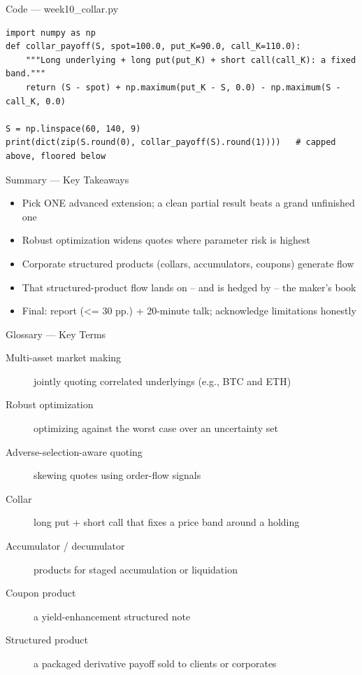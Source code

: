 \documentclass[aspectratio=169,10pt]{beamer}
\begin{document}
\begin{frame}[fragile]{Code --- week10\_collar.py}
\begin{lstlisting}
import numpy as np
def collar_payoff(S, spot=100.0, put_K=90.0, call_K=110.0):
    """Long underlying + long put(put_K) + short call(call_K): a fixed band."""
    return (S - spot) + np.maximum(put_K - S, 0.0) - np.maximum(S - call_K, 0.0)

S = np.linspace(60, 140, 9)
print(dict(zip(S.round(0), collar_payoff(S).round(1))))   # capped above, floored below
\end{lstlisting}
\end{frame}
\begin{frame}{Summary --- Key Takeaways}
\begin{itemize}
  \item Pick ONE advanced extension; a clean partial result beats a grand unfinished one
  \item Robust optimization widens quotes where parameter risk is highest
  \item Corporate structured products (collars, accumulators, coupons) generate flow
  \item That structured-product flow lands on -- and is hedged by -- the maker's book
  \item Final: report (\textless{}= 30 pp.) + 20-minute talk; acknowledge limitations honestly
\end{itemize}
\end{frame}

\begin{frame}{Glossary --- Key Terms}
\footnotesize\begin{description}
\item[\color{ncsured}Multi-asset market making] jointly quoting correlated underlyings (e.g., BTC and ETH)
\item[\color{ncsured}Robust optimization] optimizing against the worst case over an uncertainty set
\item[\color{ncsured}Adverse-selection-aware quoting] skewing quotes using order-flow signals
\item[\color{ncsured}Collar] long put + short call that fixes a price band around a holding
\item[\color{ncsured}Accumulator / decumulator] products for staged accumulation or liquidation
\item[\color{ncsured}Coupon product] a yield-enhancement structured note
\item[\color{ncsured}Structured product] a packaged derivative payoff sold to clients or corporates
\end{description}
\end{frame}
\end{document}
